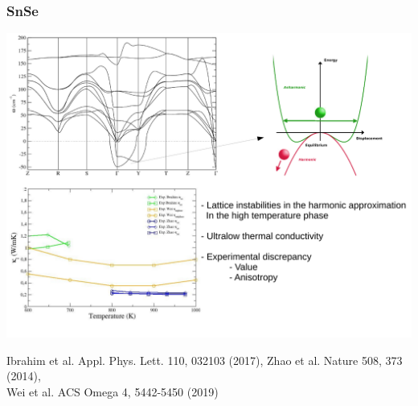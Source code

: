 \documentclass{beamer}
\begin{document}
\begin{frame}

\frametitle{SnSe}
\vspace{-0.2cm}
\begin{center}
  \includegraphics[width=0.85\linewidth]{Pictures/SnSe/figure2.pdf}
\end{center}
\vspace{-0.6cm}
\begin{tiny}
 Ibrahim et al. Appl. Phys. Lett. 110, 032103 (2017), Zhao et al. Nature 508, 373 (2014), \\
 Wei et al. ACS Omega 4, 5442-5450 (2019)
\end{tiny}

\end{frame}

\end{document}
